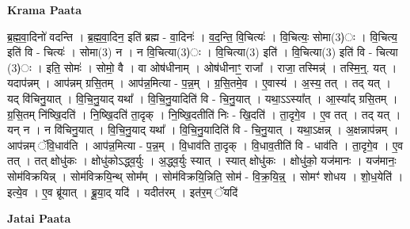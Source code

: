 \documentclass[17pt]{extarticle}
\begin{document}
\textbf{Krama Paata} \newline

ब्र॒ह्म॒वा॒दिनो॑ वदन्ति । ब्र॒ह्म॒वा॒दिन॒ इति॑ ब्रह्म - वा॒दिनः॑ । व॒द॒न्ति॒ वि॒चित्यः॑ । वि॒चित्यः॒ सोमा(3)ः । वि॒चित्य॒ इति॑ वि - चित्यः॑ । सोमा(3) न । न वि॒चित्या(3)ः । वि॒चित्या(3) इति॑ । वि॒चित्या(3) इति॑ वि - चित्या (3)ः । इति॒ सोमः॑ । सोमो॒ वै । वा ओष॑धीनाम् । ओष॑धीनाꣳ॒॒ राजा᳚ । राजा॒ तस्मिन्न्॑ । तस्मि॒न्॒. यत् । यदाप॑न्नम् । आप॑न्नम् ग्रसि॒तम् । आप॑न्न॒मित्या - प॒न्न॒म् । ग्र॒सि॒तमे॒व । ए॒वास्य॑ । अ॒स्य॒ तत् । तद् यत् । यद् वि॑चिनु॒यात् । वि॒चि॒नु॒याद् यथा᳚ । वि॒चि॒नु॒यादिति॑ वि - चि॒नु॒यात् । यथा॒ऽऽस्या᳚त् । आ॒स्या᳚द् ग्रसि॒तम् । ग्र॒सि॒तम् नि॑ष्खि॒दति॑ । नि॒ष्खि॒दति॑ ता॒दृक् । नि॒ष्खि॒दतीति॑ निः - खि॒दति॑ । ता॒दृगे॒व । ए॒व तत् । तद् यत् । यन् न । न वि॑चिनु॒यात् । वि॒चि॒नु॒याद् यथा᳚ । वि॒चि॒नु॒यादिति॑ वि - चि॒नु॒यात् । यथा॒ऽक्षन्न् । अ॒क्षन्नाप॑न्नम् । आप॑न्नम् ॅवि॒धाव॑ति । आप॑न्न॒मित्या - प॒न्न॒म् । वि॒धाव॑ति ता॒दृक् । वि॒धाव॒तीति॑ वि - धाव॑ति । ता॒दृगे॒व । ए॒व तत् । तत् क्षोधु॑कः । क्षोधु॑कोऽद्ध्व॒र्युः । अ॒द्ध्व॒र्युः स्यात् । स्यात् क्षोधु॑कः । क्षोधु॑को॒ यज॑मानः । यज॑मानः॒ सोम॑विक्रयिन्न् । सोम॑विक्रयि॒न्थ् सोम᳚म् । सोम॑विक्रयि॒न्निति॒ सोम॑ - वि॒क्र॒यि॒न्न्॒ । सोमꣳ॑ शोधय । शो॒ध॒येति॑ । इत्ये॒व । ए॒व ब्रू॑यात् । ब्रू॒या॒द् यदि॑ । यदीत॑रम् । इत॑र॒म् ॅयदि॑ \newline

\textbf{Jatai Paata} \newline
\end{document}
